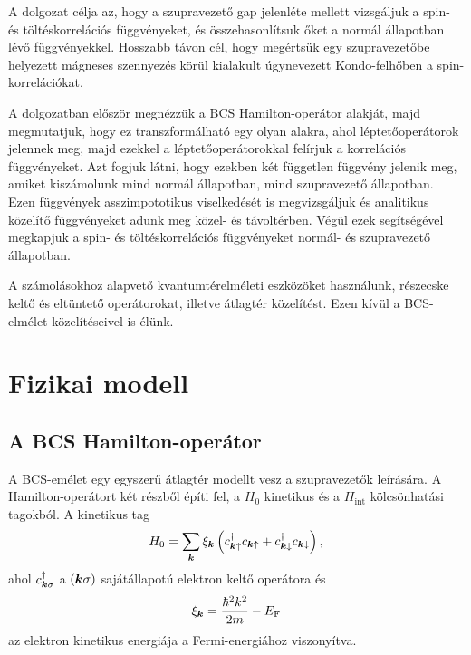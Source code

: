 \documentclass[a4paper,12pt,titlepage]{article}
\newcommand{\KK}{{\vb*{k}}}
\begin{document}
\newpage

A dolgozat célja az, hogy a szupravezető gap jelenléte mellett vizsgáljuk a spin- és töltéskorrelációs függvényeket, és összehasonlítsuk őket a normál állapotban lévő függvényekkel.  Hosszabb távon cél, hogy megértsük egy szupravezetőbe helyezett mágneses szennyezés körül kialakult úgynevezett Kondo-felhőben a spin-korrelációkat.

A dolgozatban először megnézzük a BCS Hamilton-operátor alakját, majd megmutatjuk, hogy ez transzformálható egy olyan alakra, ahol léptetőoperátorok jelennek meg, majd ezekkel a léptetőoperátorokkal felírjuk a korrelációs függvényeket.  Azt fogjuk látni, hogy ezekben két független függvény jelenik meg, amiket kiszámolunk mind normál állapotban, mind szupravezető állapotban.  Ezen függvények asszimpototikus viselkedését is megvizsgáljuk és analitikus közelítő függvényeket adunk meg közel- és távoltérben.  Végül ezek segítségével megkapjuk a spin- és töltéskorrelációs függvényeket normál- és szupravezető állapotban.

A számolásokhoz alapvető kvantumtérelméleti eszközöket használunk, részecske keltő és eltüntető operátorokat, illetve átlagtér közelítést.  Ezen kívül a BCS-elmélet közelítéseivel is élünk.



\section{Fizikai modell}

\subsection{A BCS Hamilton-operátor}

A BCS-emélet egy egyszerű átlagtér modellt vesz a szupravezetők leírására.  A Hamilton-operátort két részből építi fel, a $H_0$ kinetikus és a $H_\text{int}$ kölcsönhatási tagokból.  A kinetikus tag
\begin{equation}
	H_0 = \sum\limits_\KK \xi_\KK \left( c_{\KK \uparrow}^\dagger c_{\KK \uparrow} + c_{\KK \downarrow}^\dagger c_{\KK \downarrow} \right),
\end{equation}
ahol $c_{\KK \sigma}^\dagger$ a $\left( \KK \sigma \right)$ sajátállapotú elektron keltő operátora és
$$ \xi_\KK = \frac{\hbar^2 k^2}{2 m} - E_\text{F} $$
az elektron kinetikus energiája a Fermi-energiához viszonyítva.
\end{document}
